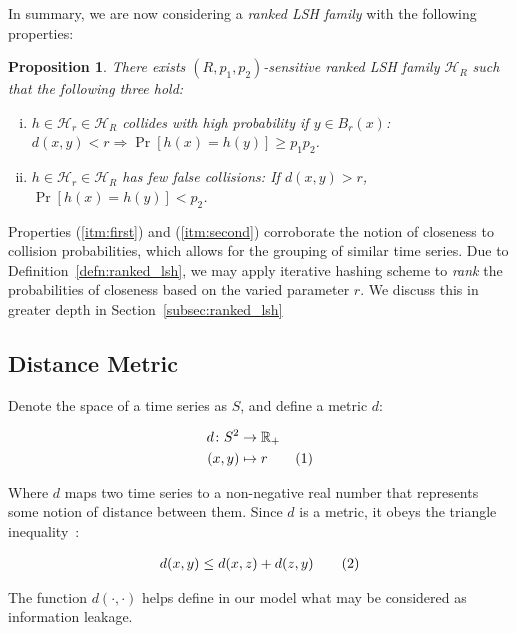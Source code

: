 \documentclass[a4paper]{article}
\newcommand\numberthis{\addtocounter{equation}{1}\tag{\theequation}}
\newtheorem{proposition}[definition]{Proposition}
\begin{document}
In summary, we are now considering a \textit{ranked LSH family} with the following properties:
\begin{proposition}\label{prop:ranked_lsh}
    There exists $(R,p_1,p_2)$-sensitive ranked LSH family $\mathcal{H}_R$ such that the following three hold:
    \begin{enumerate}[(i)]
        \item\label{itm:first} $h \in \mathcal{H}_r \in \mathcal{H}_R$ collides with high probability if $y \in B_r(x)$: $d(x,y) < r \Rightarrow \Pr[h(x) = h(y)] \ge p_1 p_2$.
        \item\label{itm:second} $h \in \mathcal{H}_r \in \mathcal{H}_R$ has few false collisions: If $d(x,y) > r$, $\Pr[h(x) = h(y)] < p_2$.
    \end{enumerate}
\end{proposition}

Properties (\ref{itm:first}) and (\ref{itm:second}) corroborate the notion of closeness to collision probabilities, which allows for the grouping of similar time series.
Due to Definition~\ref{defn:ranked_lsh}, we may apply iterative hashing scheme to \textit{rank} the probabilities of closeness based on the varied parameter $r$.
We discuss this in greater depth in Section~\ref{subsec:ranked_lsh}

\subsection{Distance Metric}
Denote the space of a time series as $S$, and define a metric $d$:

\begin{align*}
    d \colon S^2 &\to \mathbb{R}_{+}\\
    (x,y) &\mapsto r \numberthis
\end{align*}

Where $d$ maps two time series to a non-negative real number that represents some notion of distance between them.
Since $d$ is a metric, it obeys the triangle inequality~\cite{rosenlicht68-realanalysis}:

\begin{align*}
    d(x,y) \le d(x,z) + d(z,y) \numberthis
\end{align*}


The function $d(\cdot,\cdot)$ helps define in our model what may be considered as information leakage.

\end{document}
